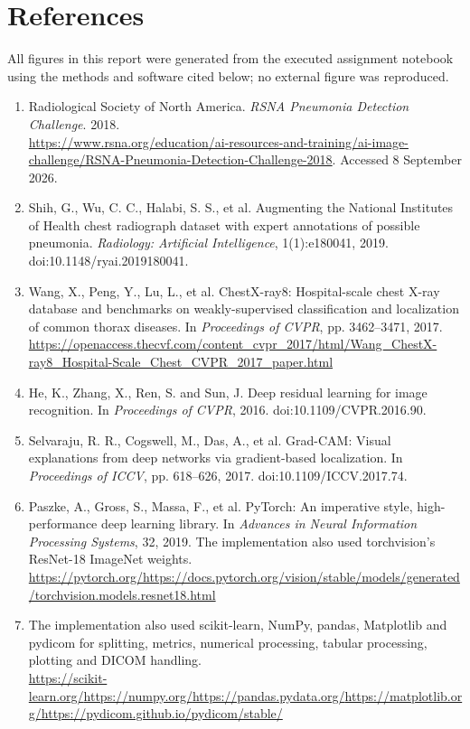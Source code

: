 \documentclass[10pt,a4paper]{article}
\begin{document}
\section*{References}
\scriptsize
\sloppy
All figures in this report were generated from the executed assignment notebook using the methods and software cited below; no external figure was reproduced.
\begin{enumerate}[nosep]
\item Radiological Society of North America. \emph{RSNA Pneumonia Detection Challenge}. 2018.\\
\url{https://www.rsna.org/education/ai-resources-and-training/ai-image-challenge/RSNA-Pneumonia-Detection-Challenge-2018}. Accessed 8 September 2026.
\item Shih, G., Wu, C. C., Halabi, S. S., et al. Augmenting the National Institutes of Health chest radiograph dataset with expert annotations of possible pneumonia. \emph{Radiology: Artificial Intelligence}, 1(1):e180041, 2019. doi:10.1148/ryai.2019180041.
\item Wang, X., Peng, Y., Lu, L., et al. ChestX-ray8: Hospital-scale chest X-ray database and benchmarks on weakly-supervised classification and localization of common thorax diseases. In \emph{Proceedings of CVPR}, pp. 3462--3471, 2017.\\
\url{https://openaccess.thecvf.com/content_cvpr_2017/html/Wang_ChestX-ray8_Hospital-Scale_Chest_CVPR_2017_paper.html}
\item He, K., Zhang, X., Ren, S. and Sun, J. Deep residual learning for image recognition. In \emph{Proceedings of CVPR}, 2016. doi:10.1109/CVPR.2016.90.
\item Selvaraju, R. R., Cogswell, M., Das, A., et al. Grad-CAM: Visual explanations from deep networks via gradient-based localization. In \emph{Proceedings of ICCV}, pp. 618--626, 2017. doi:10.1109/ICCV.2017.74.
\item Paszke, A., Gross, S., Massa, F., et al. PyTorch: An imperative style, high-performance deep learning library. In \emph{Advances in Neural Information Processing Systems}, 32, 2019. The implementation also used torchvision's ResNet-18 ImageNet weights.\\
\url{https://pytorch.org/}\quad\url{https://docs.pytorch.org/vision/stable/models/generated/torchvision.models.resnet18.html}
\item The implementation also used scikit-learn, NumPy, pandas, Matplotlib and pydicom for splitting, metrics, numerical processing, tabular processing, plotting and DICOM handling.\\
\url{https://scikit-learn.org/}\quad\url{https://numpy.org/}\quad\url{https://pandas.pydata.org/}\quad\url{https://matplotlib.org/}\quad\url{https://pydicom.github.io/pydicom/stable/}
\end{enumerate}
\end{document}
